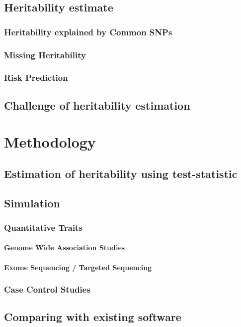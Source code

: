 \documentclass{report}
\begin{document}
\subsection{Heritability estimate}
\subsubsection{Heritability explained by Common SNPs}
\subsubsection{Missing Heritability}
\subsubsection{Risk Prediction}
\subsection{Challenge of heritability estimation}
\section{Methodology}
\subsection{Estimation of heritability using test-statistic}
\subsection{Simulation}
\subsubsection{Quantitative Traits}
\paragraph{Genome Wide Association Studies}
\paragraph{Exome Sequencing / Targeted Sequencing}
\subsubsection{Case Control Studies}
\subsection{Comparing with existing software}
\end{document}
